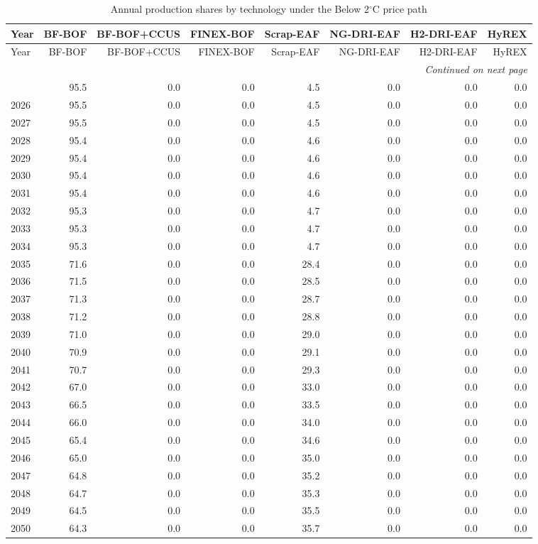 \begin{longtable}{@{}lrrrrrrr@{}}
\caption{Annual production shares by technology under the Below 2$^\circ$C price path}
\label{tab:annual-shares-ngfs_below2c}
\toprule
Year & BF-BOF & BF-BOF+CCUS & FINEX-BOF & Scrap-EAF & NG-DRI-EAF & H2-DRI-EAF & HyREX \\
\midrule
\endfirsthead
\toprule
Year & BF-BOF & BF-BOF+CCUS & FINEX-BOF & Scrap-EAF & NG-DRI-EAF & H2-DRI-EAF & HyREX \\
\midrule
\endhead
\bottomrule \multicolumn{8}{r}{\textit{Continued on next page}} \\
\endfoot
\bottomrule
\endlastfoot
2025 & 95.5 & 0.0 & 0.0 & 4.5 & 0.0 & 0.0 & 0.0 \\
2026 & 95.5 & 0.0 & 0.0 & 4.5 & 0.0 & 0.0 & 0.0 \\
2027 & 95.5 & 0.0 & 0.0 & 4.5 & 0.0 & 0.0 & 0.0 \\
2028 & 95.4 & 0.0 & 0.0 & 4.6 & 0.0 & 0.0 & 0.0 \\
2029 & 95.4 & 0.0 & 0.0 & 4.6 & 0.0 & 0.0 & 0.0 \\
2030 & 95.4 & 0.0 & 0.0 & 4.6 & 0.0 & 0.0 & 0.0 \\
2031 & 95.4 & 0.0 & 0.0 & 4.6 & 0.0 & 0.0 & 0.0 \\
2032 & 95.3 & 0.0 & 0.0 & 4.7 & 0.0 & 0.0 & 0.0 \\
2033 & 95.3 & 0.0 & 0.0 & 4.7 & 0.0 & 0.0 & 0.0 \\
2034 & 95.3 & 0.0 & 0.0 & 4.7 & 0.0 & 0.0 & 0.0 \\
2035 & 71.6 & 0.0 & 0.0 & 28.4 & 0.0 & 0.0 & 0.0 \\
2036 & 71.5 & 0.0 & 0.0 & 28.5 & 0.0 & 0.0 & 0.0 \\
2037 & 71.3 & 0.0 & 0.0 & 28.7 & 0.0 & 0.0 & 0.0 \\
2038 & 71.2 & 0.0 & 0.0 & 28.8 & 0.0 & 0.0 & 0.0 \\
2039 & 71.0 & 0.0 & 0.0 & 29.0 & 0.0 & 0.0 & 0.0 \\
2040 & 70.9 & 0.0 & 0.0 & 29.1 & 0.0 & 0.0 & 0.0 \\
2041 & 70.7 & 0.0 & 0.0 & 29.3 & 0.0 & 0.0 & 0.0 \\
2042 & 67.0 & 0.0 & 0.0 & 33.0 & 0.0 & 0.0 & 0.0 \\
2043 & 66.5 & 0.0 & 0.0 & 33.5 & 0.0 & 0.0 & 0.0 \\
2044 & 66.0 & 0.0 & 0.0 & 34.0 & 0.0 & 0.0 & 0.0 \\
2045 & 65.4 & 0.0 & 0.0 & 34.6 & 0.0 & 0.0 & 0.0 \\
2046 & 65.0 & 0.0 & 0.0 & 35.0 & 0.0 & 0.0 & 0.0 \\
2047 & 64.8 & 0.0 & 0.0 & 35.2 & 0.0 & 0.0 & 0.0 \\
2048 & 64.7 & 0.0 & 0.0 & 35.3 & 0.0 & 0.0 & 0.0 \\
2049 & 64.5 & 0.0 & 0.0 & 35.5 & 0.0 & 0.0 & 0.0 \\
2050 & 64.3 & 0.0 & 0.0 & 35.7 & 0.0 & 0.0 & 0.0 \\
\end{longtable}

